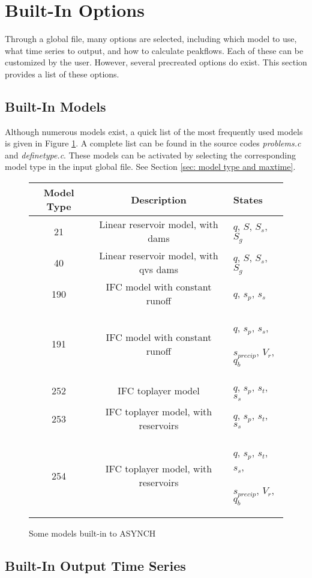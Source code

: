 \documentclass[12pt]{article}
\begin{document}
\section{Built-In Options} \label{sec: built-in options}

Through a global file, many options are selected, including which model to use, what time series to output, and how to calculate peakflows. Each of these can be customized by the user. However, several precreated options do exist. This section provides a list of these options.

\subsection{Built-In Models} \label{sec: built-in models}

Although numerous models exist, a quick list of the most frequently used models is given in Figure \ref{fig: built-in models}. A complete list can be found in the source codes \emph{problems.c} and \emph{definetype.c}. These models can be activated by selecting the corresponding model type in the input global file. See Section \ref{sec: model type and maxtime}.
\begin{figure}[ht]
 \centering
 \begin{tabular}{|c|c|p{2.5cm}|}
  \hline
  Model Type & Description & States\\
  \hline
   21  & Linear reservoir model, with dams & $q$, $S$, $S_s$, $S_g$ \\
   40  & Linear reservoir model, with qvs dams & $q$, $S$, $S_s$, $S_g$ \\
   190 & IFC model with constant runoff & $q$, $s_p$, $s_s$ \\
   191 & IFC model with constant runoff & $q$, $s_p$, $s_s$,\par $s_{precip}$, $V_r$, $q_b$ \\
   252 & IFC toplayer model & $q$, $s_p$, $s_t$, $s_s$ \\
   253 & IFC toplayer model, with reservoirs & $q$, $s_p$, $s_t$, $s_s$ \\
   254 & IFC toplayer model, with reservoirs & $q$, $s_p$, $s_t$, $s_s$,\par $s_{precip}$, $V_r$, $q_b$ \\
   \hline
  \end{tabular}
 \caption{Some models built-in to ASYNCH}
 \label{fig: built-in models}
\end{figure}


\subsection{Built-In Output Time Series} \label{sec: built-in output time series}
\end{document}
